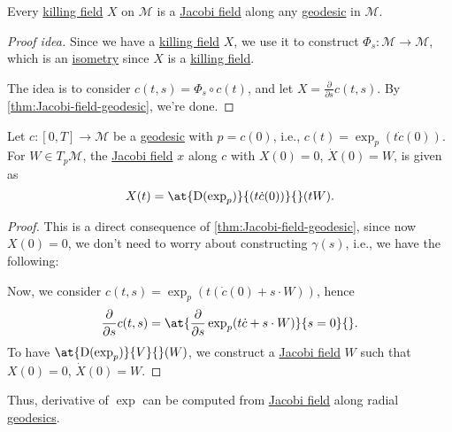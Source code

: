 \begin{corollary}
	Every \hyperref[def:killing-field]{killing field} \(X\) on \(\mathcal{M} \) is a \hyperref[def:Jacobi-field]{Jacobi field} along any \hyperref[def:geodesic]{geodesic} in \(\mathcal{M} \).
\end{corollary}
\begin{proof}[Proof idea]
	Since we have a \hyperref[def:killing-field]{killing field} \(X\), we use it to construct \(\Phi _s \colon \mathcal{M} \to \mathcal{M} \), which is an \hyperref[def:isometry]{isometry} since \(X\) is a \hyperref[def:killing-field]{killing field}.
	\begin{center}
	\end{center}
	The idea is to consider \(c(t, s) = \Phi _s \circ c(t)\), and let \(X = \frac{\partial }{\partial s} c(t, s)\). By \autoref{thm:Jacobi-field-geodesic}, we're done.
\end{proof}

\begin{corollary}
	Let \(c\colon [0, T] \to \mathcal{M} \) be a \hyperref[def:geodesic]{geodesic} with \(p = c(0)\), i.e., \(c(t) = \exp _p (t \dot{c} (0))\). For \(W\in T_p \mathcal{M} \), the \hyperref[def:Jacobi-field]{Jacobi field} \(x\) along \(c\) with \(X(0) = 0\), \(\dot{X} ( 0) = W\), is given as
	\[
		X(t) = \at{\mathrm{D} (\exp _p)}{(t \dot{c} (0))}{} (tW).
	\]
\end{corollary}
\begin{proof}
	This is a direct consequence of \autoref{thm:Jacobi-field-geodesic}, since now \(X(0) = 0\), we don't need to worry about constructing \(\gamma (s)\), i.e., we have the following:
	\begin{center}
	\end{center}
	Now, we consider \(c(t, s) = \exp _p (t(\dot{c} (0) + s\cdot W))\), hence
	\[
		\frac{\partial }{\partial s} c(t, s) = \at{\frac{\partial }{\partial s} \exp _p(t \dot{c} + s\cdot W)}{s = 0}{} .
	\]
	To have \(\at{\mathrm{D} (\exp _p)}{V}{} (W)\), we construct a \hyperref[def:Jacobi-field]{Jacobi field} \(W\) such that \(X(0)=0\), \(\dot{X} (0) = W\).
\end{proof}

\begin{remark}
	Thus, derivative of \(\exp \) can be computed from \hyperref[def:Jacobi-field]{Jacobi field} along radial \hyperref[def:geodesic]{geodesics}.
\end{remark}

